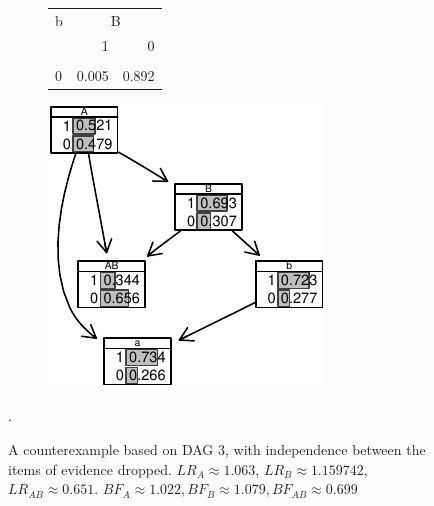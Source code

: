 \documentclass[
  10pt,
  dvipsnames,enabledeprecatedfontcommands]{scrartcl}
\begin{document}
\begin{figure}
\begin{subfigure}[ht!]{0.45\textwidth}
\begin{table}[H]
\centering
\begin{tabular}{lrr}
\toprule
\multicolumn{1}{c}{b} & \multicolumn{2}{c}{B} \\
  & 1 & 0\\
\midrule
\cellcolor{gray!6}{1} & \cellcolor{gray!6}{0.995} & \cellcolor{gray!6}{0.108}\\
0 & 0.005 & 0.892\\
\bottomrule
\end{tabular}
\end{table}
\end{subfigure} 
\hspace{5mm}\begin{subfigure}{0.45\textwidth}

\begin{center}\includegraphics[width=1\linewidth]{conjunction-appendix13_files/figure-latex/unnamed-chunk-29-1} \end{center}
\end{subfigure} 
\caption{A counterexample based on \textsf{DAG 3}, with independence between the items of evidence dropped.   $LR_A  \approx 1.063$, $LR_B \approx 1.159742$,  $LR_{AB} \approx 0.651$. $BF_A \approx  1.022, BF_B \approx  1.079, BF_{AB}\approx   0.699$}.
\label{fig:CPTDoubleL}
\end{figure}
\end{document}
